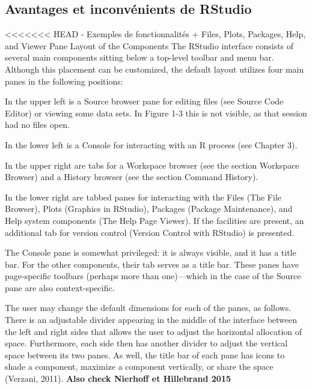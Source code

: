 \documentclass[
  letterpaper,
  DIV=11,
  numbers=noendperiod]{scrreprt}
\begin{document}
\hypertarget{avantages-et-inconvuxe9nients-de-rstudio-1}{%
\subsection{Avantages et inconvénients de
RStudio}\label{avantages-et-inconvuxe9nients-de-rstudio-1}}

\textless\textless\textless\textless\textless\textless\textless{} HEAD -
Exemples de fonctionnalités + Files, Plots, Packages, Help, and Viewer
Pane Layout of the Components The RStudio interface consists of several
main components sitting below a top-level toolbar and menu bar. Although
this placement can be customized, the default layout utilizes four main
panes in the following positions:

In the upper left is a Source browser pane for editing files (see Source
Code Editor) or viewing some data sets. In Figure 1-3 this is not
visible, as that session had no files open.

In the lower left is a Console for interacting with an R process (see
Chapter 3).

In the upper right are tabs for a Workspace browser (see the section
Workspace Browser) and a History browser (see the section Command
History).

In the lower right are tabbed panes for interacting with the Files (The
File Browser), Plots (Graphics in RStudio), Packages (Package
Maintenance), and Help system components (The Help Page Viewer). If the
facilities are present, an additional tab for version control (Version
Control with RStudio) is presented.

The Console pane is somewhat privileged: it is always visible, and it
has a title bar. For the other components, their tab serves as a title
bar. These panes have page-specific toolbars (perhaps more than
one)---which in the case of the Source pane are also context-specific.

The user may change the default dimensions for each of the panes, as
follows. There is an adjustable divider appearing in the middle of the
interface between the left and right sides that allows the user to
adjust the horizontal allocation of space. Furthermore, each side then
has another divider to adjust the vertical space between its two panes.
As well, the title bar of each pane has icons to shade a component,
maximize a component vertically, or share the space (Verzani, 2011).
\textbf{Also check Nierhoff et Hillebrand 2015}
\end{document}
